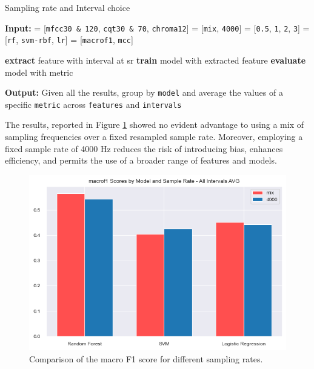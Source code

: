 \begin{algorithm}
    \small
    \caption{Sampling rate and Interval choice}
    \label{alg:sr_choice}
    \begin{algorithmic}[1]
        \State \textbf{Input:}
         = [\texttt{mfcc30 \& 120}, \texttt{cqt30 \& 70}, \texttt{chroma12}]
         = [\texttt{mix}, \texttt{4000}]
         = [\texttt{0.5}, \texttt{1}, \texttt{2}, \texttt{3}]
         = [\texttt{rf}, \texttt{svm-rbf}, \texttt{lr}]
         = [\texttt{macrof1}, \texttt{mcc}]

        \vspace{0.2cm}
        \State \textbf{extract} {feature} with {interval} at {sr}
        \State \textbf{train} {model} with extracted {feature}
        \State \textbf{evaluate} {model} with {metric}
        \EndFor
        \EndFor
        \EndFor
        \EndFor
        \EndFor

        \State \textbf{Output:}
        \State Given all the results, group by \texttt{model} and average the values of a specific \texttt{metric} across \texttt{features} and \texttt{intervals}

    \end{algorithmic}
\end{algorithm}

\noindent
The results, reported in Figure \ref{fig:FE_sampling_rate.png} showed no evident advantage to using a mix of sampling frequencies over a fixed resampled sample rate.
Moreover, employing a fixed sample rate of 4000 Hz reduces the risk of introducing bias, enhances efficiency,
and permits the use of a broader range of features and models.

\begin{figure}[H]
    \centering
    \includegraphics[width=1\columnwidth]{./images/FE_sampling_rate.png}
    \caption{Comparison of the macro F1 score for different sampling rates.}
    \label{fig:FE_sampling_rate.png}
\end{figure}


